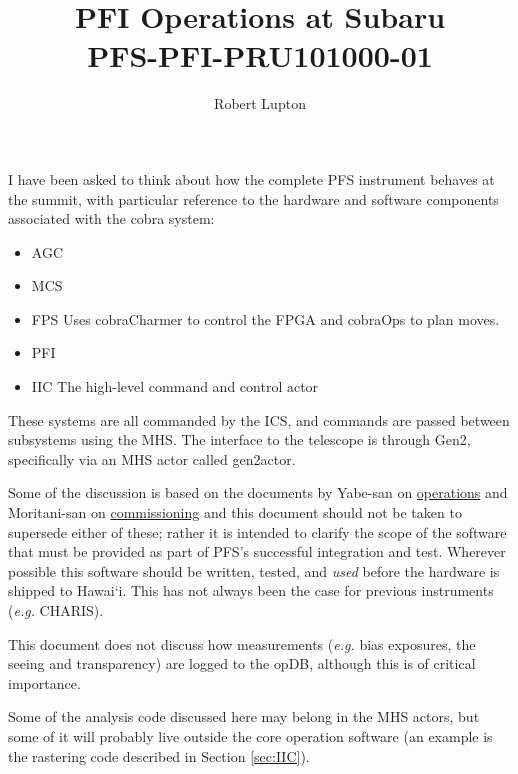 \documentclass[12pt]{article}
\newcommand{\eg}{\textit{e.g.}\xspace}
\newcommand{\AGC}{\gls{AGC}\xspace}
\newcommand{\ICS}{\gls{ICS}\xspace}
\newcommand{\IIC}{\gls{IIC}\xspace}
\newcommand{\MCS}{\gls{MCS}\xspace}
\newcommand{\MHS}{\gls{MHS}\xspace}
\newcommand{\FPS}{\gls{FPS}\xspace}
\newcommand{\opDB}{\gls{opDB}\xspace}
\newcommand{\PFI}{\gls{PFI}\xspace}
\newcommand{\PFS}{\gls{PFS}\xspace}
\newcommand{\secRef}[1]{Section \ref{sec:#1}}
\begin{document}
\title{\acrshort{PFI} Operations at Subaru \\ \large PFS-PFI-PRU101000-01}
\author{Robert Lupton}
\maketitle


I have been asked to think about how the complete \PFS instrument behaves at the summit, with particular
reference to the hardware and software components associated with the cobra system:
\begin{itemize}
\item\AGC
\item\MCS
\item\FPS
  Uses \gls{cobraCharmer} to control the \gls{FPGA} and \gls{cobraOps} to plan moves. 
\item\PFI
\item\IIC
  The high-level command and control actor
\end{itemize}

These systems are all commanded by the \ICS, and commands are passed between subsystems
using the \MHS. The interface to the telescope is through \gls{Gen2}, specifically via an \MHS
actor called \gls{gen2actor}.

Some of the discussion is based on the
documents by Yabe-san on \href{https://github.com/Subaru-PFS/doc/tree/master/operation}{operations} and
Moritani-san on 
\href{https://github.com/Subaru-PFS/ics\_doc/blob/master/commissioning/commissioning\_details.pdf}{commissioning} and this document should not be taken to supersede either of these;  rather it is intended to clarify the
scope of the software that must be provided as part of \PFS's successful integration and test.  Wherever
possible this software should be written, tested, and \textit{used} before the hardware is shipped to Hawai`i.
This has not always been the case for previous instruments (\eg CHARIS).

This document does not discuss how measurements (\eg bias exposures, the seeing and transparency) are logged
to the \opDB, although this is of critical importance.

Some of the analysis code discussed here may belong in the \MHS actors, but some of it will probably
live outside the core operation software (an example is the rastering code described in \secRef{IIC}).
\end{document}

